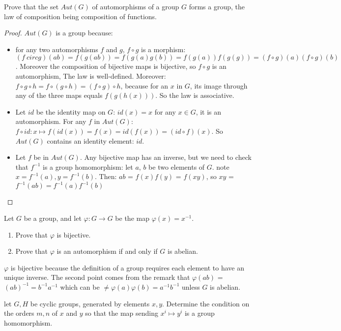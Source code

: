 \begin{boxedProblem}[2.3.11]
    Prove that the set $Aut(G)$ of automorphisms of a group $G$ forms a group, the law of composition being composition of functions.
\end{boxedProblem}
\begin{proof}
$Aut(G)$ is a group because: \begin{itemize}
\item for any two automorphisms $f$ and $g$, $f\circ g$ is a morphism: $(f\ circ g)(ab) = f(g(ab)) = f(g(a)g(b)) = f(g(a)) f(g(g)) = (f\circ g)(a) (f\circ g)(b)$. Moreover the composition of bijective maps is bijective, so $f\circ g$ is an automorphism, The law is well-defined. Moreover: $f\circ g \circ h = f\circ (g\circ h) = (f\circ g)\circ h$, because for an $x$ in $G$, its image through any of the three maps equals $f(g(h(x)))$. So the law is associative.
\item Let $id$ be the identity map on $G$: $id(x) = x$ for any $x \in G$, it is an automorphism. For any $f$ in $Aut(G)$: $f\circ id: x\longmapsto f(id(x)) = f(x) = id(f(x)) = (id\circ f) (x)$. So $Aut(G)$ contains an identity element: $id$. 
\item Let $f$ be in $Aut(G)$. Any bijective map has an inverse, but we need to check that $f^{-1}$ is a group homomorphism: let $a$, $b$ be two elements of $G$. note $x = f^{-1}(a), y=f^{-1}(b)$. Then: $ab$ = $f(x)f(y)$ = $f(xy)$, so $xy$ = $f^{-1}(ab) = f^{-1}(a)f^{-1}(b)$ 
\end{itemize}
\end{proof}

\begin{boxedProblem}[2.3.12]
    Let $G$ be a group, and let $\varphi:G \longrightarrow G$ be the map $\varphi(x) = x^{-1}$.
    \begin{enumerate}
    \item Prove that $\varphi$ is bijective.
    \item Prove that $\varphi$ is an automorphism if and only if $G$ is abelian.
\end{enumerate}
\end{boxedProblem}
    $\varphi$ is bijective because the definition of a group requires each element to have an unique inverse. The second point comes from the remark that $\varphi(ab)$ = $(ab)^{-1} = b^{-1}a^{-1}$ which can be $\neq \varphi(a)\varphi(b) = a^{-1}b^{-1}$ unless $G$ is abelian.

\begin{boxedProblem}[2.4.11]\label{exo:cyclic-morphism}
    let $G, H$ be cyclic groups, generated by elements $x, y$. Determine the condition on the orders $m, n$ of $x$ and $y$ so that the map sending $x^i \longmapsto y^i$ is a group homomorphism.
\end{boxedProblem}

